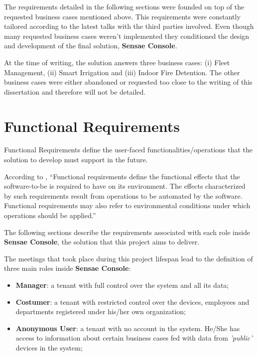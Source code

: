 The requirements detailed in the following sections were founded on top of the requested business cases mentioned above. This requirements were constantly tailored according to the latest talks with the third parties involved. Even though many requested business cases weren't implemented they conditioned the design and development of the final solution, \textbf{Sensae Console}.

At the time of writing, the solution answers three business cases: (i) Fleet Management, (ii) Smart Irrigation and (iii) Indoor Fire Detention. The other business cases were either abandoned or requested too close to the writing of this dissertation and therefore will not be detailed.

\section{Functional Requirements}
\label{sec:requirements:functional}

Functional Requirements define the user-faced functionalities/operations that the solution to develop must support in the future.

According to \cite{van2009requirements}, ``Functional requirements define the functional effects that the software-to-be is required to have on its environment. The effects characterized by such requirements result from operations to be automated by the software. Functional requirements may also refer to environmental conditions under which operations should be applied.''

The following sections describe the requirements associated with each role inside \textbf{Sensae Console}, the solution that this project aims to deliver.

The meetings that took place during this project lifespan lead to the definition of three main roles inside \textbf{Sensae Console}:

\begin{itemize}
    \item \textbf{Manager}: a tenant with full control over the system and all its data;
    \item \textbf{Costumer}: a tenant with restricted control over the devices, employees and departments registered under his/her own organization;
    \item \textbf{Anonymous User}: a tenant with no account in the system. He/She has access to information about certain business cases fed with data from \textit{'public'} devices in the system;
\end{itemize}

